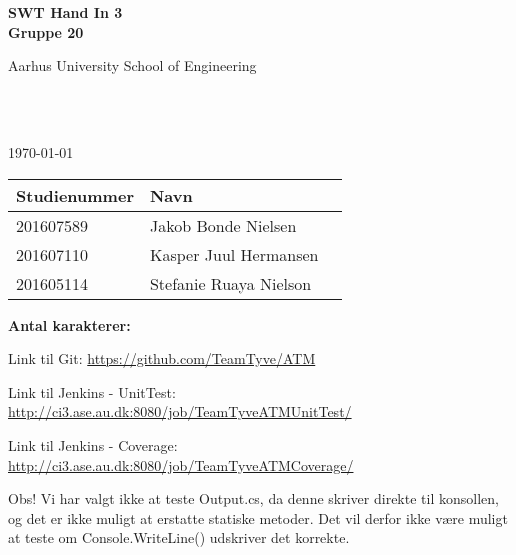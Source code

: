\begin{center}
	{\fontsize{36pt}{0}\selectfont
		\textbf{
		SWT Hand In 3\\
		Gruppe 20\\
		}
	}
	\vspace{20pt}

	{\fontsize{14pt}{0}\selectfont
		Aarhus University School of Engineering\\
	}
	\vspace{20pt}

	{\fontsize{24pt}{0}\selectfont
		\thetitle\\
	}
	\vspace{20pt}

	{\fontsize{18pt}{0}\selectfont
		\ifdefined\frontpageDate
			\frontpageDate\\
		\else
			\today\\
		\fi
	}
	\vspace{20pt}

	\vspace{5pt}
	\begin{tabular}{|l|l|l|}
		\hline
		\rowcolor{gray!50}
		\textbf{Studienummer} & \textbf{Navn}\\ [5px]
		\hline
		201607589 & Jakob Bonde Nielsen\\
		\hline
		201607110 & Kasper Juul Hermansen\\
		\hline
		201605114 & Stefanie Ruaya Nielson\\
		\hline
	\end{tabular}


	\ifdefined\frontpageCharacters
		\vspace{10pt}
		\textbf{Antal karakterer: } \frontpageCharacters\\
	\fi
	\vspace{30pt}

\end{center}

Link til Git: \url{https://github.com/TeamTyve/ATM} \newline

Link til Jenkins - UnitTest: \url{http://ci3.ase.au.dk:8080/job/TeamTyveATMUnitTest/} \newline

Link til Jenkins - Coverage: \url{http://ci3.ase.au.dk:8080/job/TeamTyveATMCoverage/} \newline \newline

Obs! Vi har valgt ikke at teste Output.cs, da denne skriver direkte til konsollen, og det er ikke muligt at erstatte statiske metoder. Det vil derfor ikke være muligt at teste om Console.WriteLine() udskriver det korrekte. 